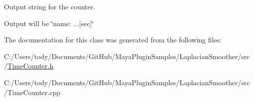 Output string for the counter. 

Output will be \char`\"{}name\+: ...\mbox{[}sec\mbox{]}\char`\"{} 

The documentation for this class was generated from the following files\+:\begin{DoxyCompactItemize}
\item 
C\+:/\+Users/tody/\+Documents/\+Git\+Hub/\+Maya\+Plugin\+Samples/\+Laplacian\+Smoother/src/\hyperlink{_time_counter_8h}{Time\+Counter.\+h}\item 
C\+:/\+Users/tody/\+Documents/\+Git\+Hub/\+Maya\+Plugin\+Samples/\+Laplacian\+Smoother/src/Time\+Counter.\+cpp\end{DoxyCompactItemize}
